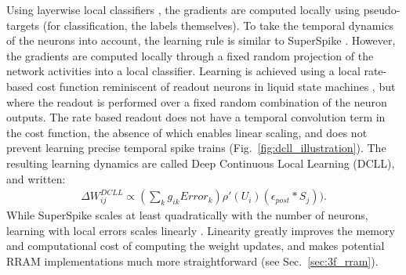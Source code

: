 \documentclass[english]{article}
\newcommand{\reffig}[1]{{Fig.~\ref{#1}}}
\newcommand{\refsec}[1]{{Sec.~\ref{#1}}}
\renewcommand{\cite}{\citep}
\begin{document}
Using layerwise local classifiers \cite{Mostafa_etal17_deepsupe}, the gradients are computed locally using pseudo-targets (for classification, the labels themselves). 
To take the temporal dynamics of the neurons into account, the learning rule is similar to SuperSpike \cite{Zenke_Ganguli17_supesupe}. However, the gradients are computed locally through a fixed random projection of the network activities into a local classifier. 
Learning is achieved using a local rate-based cost function reminiscent of readout neurons in liquid state machines \cite{Maass_etal02_realcomp}, but where the readout is performed over a fixed random combination of the neuron outputs.
The rate based readout does not have a temporal convolution term in the cost function, the absence of which enables linear scaling, and does not prevent learning precise temporal spike trains (\reffig{fig:dcll_illustration}). The resulting learning dynamics are called Deep Continuous Local Learning (DCLL), and written:
\begin{align}\label{eq:dcll_rule}
  \Delta W_{ij}^{DCLL} \propto  (\sum_k g_{ik} Error_k) \rho'(U_i) (\epsilon_{post} \ast S_j)).
\end{align}
While SuperSpike scales at least quadratically with the number of neurons, learning with local errors scales linearly \cite{Kaiser_etal18_synaplas}. 
Linearity greatly improves the memory and computational cost of computing the weight updates, and makes potential RRAM implementations much more straightforward (see \refsec{sec:3f_rram}).
%
\end{document}
